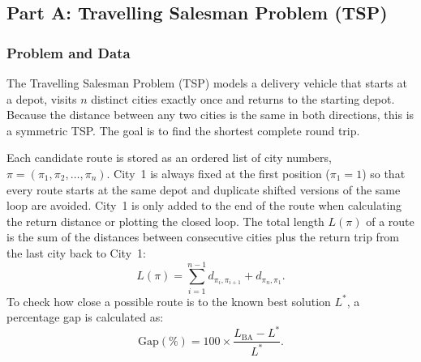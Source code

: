 
\newpage

\subsection{Part A: Travelling Salesman Problem (TSP)}

\subsubsection{Problem and Data}
The Travelling Salesman Problem (TSP) models a delivery vehicle that starts at a depot, visits \(n\) distinct cities exactly once and returns to the starting depot.
Because the distance between any two cities is the same in both directions, this is a symmetric TSP.
The goal is to find the shortest complete round trip.

Each candidate route is stored as an ordered list of city numbers, \(\pi = (\pi_1, \pi_2, \dots, \pi_n)\).
City~1 is always fixed at the first position (\(\pi_1 = 1\)) so that every route starts at the same depot and duplicate shifted versions of the same loop are avoided.
City~1 is only added to the end of the route when calculating the return distance or plotting the closed loop.
The total length \(L(\pi)\) of a route is the sum of the distances between consecutive cities plus the return trip from the last city back to City~1:
\begin{equation}
    L(\pi) = \sum_{i=1}^{n-1} d_{\pi_i, \pi_{i+1}} + d_{\pi_n, \pi_1}.
\end{equation}
To check how close a possible route is to the known best solution \(L^*\), a percentage gap is calculated as:
\begin{equation}
    \text{Gap}(\%) = 100 \times \frac{L_{\text{BA}} - L^*}{L^*}.
\end{equation}

